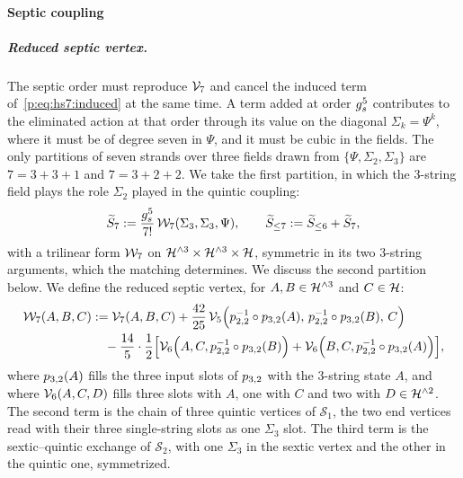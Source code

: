 \paragraph{Septic coupling}
\label{p:sec:hs:septic:dressed}

\subparagraph{Reduced septic vertex.}


The septic order must reproduce $\vertex{7}$ and cancel the induced term of~\eqref{p:eq:hs7:induced} at the same time.
A term added at order $\gs^5$ contributes to the eliminated action at that order through its value on the diagonal $\Sigma_k = \Psi^k$, where it must be of degree seven in $\Psi$, and it must be cubic in the fields.
The only partitions of seven strands over three fields drawn from $\{\Psi, \Sigma_2, \Sigma_3\}$ are $7 = 3 + 3 + 1$ and $7 = 3 + 2 + 2$.
We take the first partition, in which the $3$-string field plays the role $\Sigma_2$ played in the quintic coupling:
\begin{equation}
  \label{p:eq:hs7:S7tilde}
  \caction[7]
    := \frac{\gs^5}{7!} \, \dvertex{7}(\Sigma_3, \Sigma_3, \Psi),
  \qquad
  \caction[\le 7]
    := \caction[\le 6] + \caction[7],
\end{equation}
with a trilinear form $\dvertex{7}$ on $\Hn{3} \times \Hn{3} \times \Hs$, symmetric in its two $3$-string arguments, which the matching determines.
  We discuss the second partition below.
We define the reduced septic vertex, for $A, B \in \Hn{3}$ and $C \in \Hs$:
\begin{equation}
  \label{p:eq:hs7:dressed-vertex}
  \begin{aligned}
    \dvertex{7}(A, B, C)
      &
      := \vertex{7}(A, B, C)
        + \frac{42}{25} \, \vertex{5}\Big( \sprod{2}{2}^{-1} \circ \sprod{3}{2}(A), \, \sprod{2}{2}^{-1} \circ \sprod{3}{2}(B), \, C \Big)
      \\ &
      \quad
      - \frac{14}{5} \cdot \frac{1}{2} \Big[
        \vertex{6}\Big( A, C, \sprod{2}{2}^{-1} \circ \sprod{3}{2}(B) \Big)
        + \vertex{6}\Big( B, C, \sprod{2}{2}^{-1} \circ \sprod{3}{2}(A) \Big)
      \Big],
  \end{aligned}
\end{equation}
where $\sprod{3}{2}(A)$ fills the three input slots of $\sprod{3}{2}$ with the $3$-string state $A$, and where $\vertex{6}(A, C, D)$ fills three slots with $A$, one with $C$ and two with $D \in \Hn{2}$.
The second term is the chain of three quintic vertices of $\mathcal S_1$, the two end vertices read with their three single-string slots as one $\Sigma_3$ slot.
The third term is the sextic--quintic exchange of $\mathcal S_2$, with one $\Sigma_3$ in the sextic vertex and the other in the quintic one, symmetrized.
